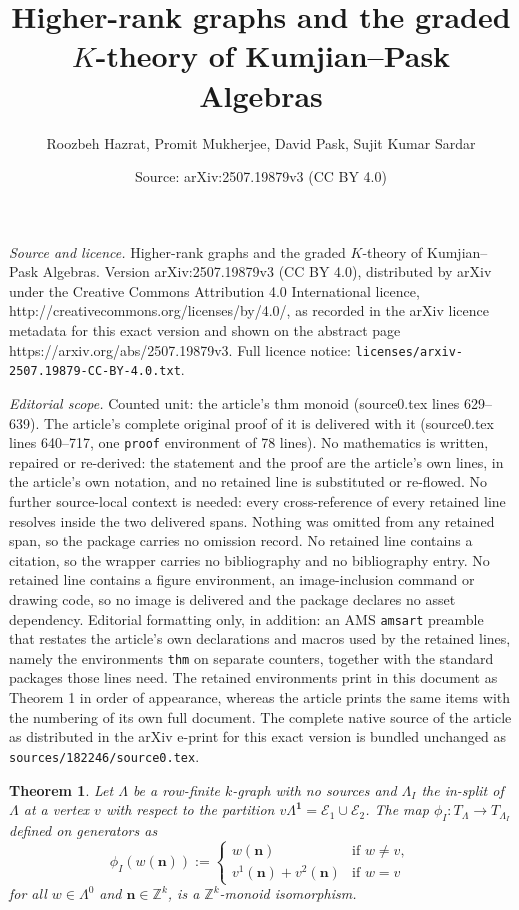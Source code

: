 \documentclass[10pt,a4paper]{amsart}
\title{Higher-rank graphs and the graded $K$-theory of Kumjian--Pask Algebras}
\author{Roozbeh Hazrat, Promit Mukherjee, David Pask, Sujit Kumar Sardar}
\date{Source: arXiv:2507.19879v3 (CC BY 4.0)}
\newtheorem{thm}{Theorem}
\newcommand{\N}{\mathbf{n}}
\begin{document}
\maketitle

\noindent\emph{Source and licence.} Higher-rank graphs and the graded $K$-theory of Kumjian--Pask Algebras. Version arXiv:2507.19879v3 (CC BY 4.0), distributed by arXiv under the Creative Commons Attribution 4.0 International licence, http://creativecommons.org/licenses/by/4.0/, as recorded in the arXiv licence metadata for this exact version and shown on the abstract page https://arxiv.org/abs/2507.19879v3. Full licence notice: \texttt{licenses/arxiv-2507.19879-CC-BY-4.0.txt}.\par\smallskip

\noindent\textit{Editorial scope.} Counted unit: the article's thm monoid (source0.tex lines 629--639). The article's complete original proof of it is delivered with it (source0.tex lines 640--717, one \texttt{proof} environment of 78 lines). No mathematics is written, repaired or re-derived: the statement and the proof are the article's own lines, in the article's own notation, and no retained line is substituted or re-flowed.  No further source-local context is needed: every cross-reference of every retained line resolves inside the two delivered spans.  Nothing was omitted from any retained span, so the package carries no omission record.  No retained line contains a citation, so the wrapper carries no bibliography and no bibliography entry.  No retained line contains a figure environment, an image-inclusion command or drawing code, so no image is delivered and the package declares no asset dependency.  Editorial formatting only, in addition: an AMS \texttt{amsart} preamble that restates the article's own declarations and macros used by the retained lines, namely the environments \texttt{thm} on separate counters, together with the standard packages those lines need.  The retained environments print in this document as Theorem 1 in order of appearance, whereas the article prints the same items with the numbering of its own full document.  The complete native source of the article as distributed in the arXiv e-print for this exact version is bundled unchanged as \texttt{sources/182246/source0.tex}.
\begin{thm}\label{th in-splitting preserves talented monoid}
Let $\Lambda$ be a row-finite $k$-graph with no sources and $\Lambda_I$ the in-split of $\Lambda$ at a vertex $v$ with respect to the partition $v\Lambda^\mathbf{1}=\mathcal{E}_1\cup \mathcal{E}_2$. The map $\phi_I: T_\Lambda \longrightarrow T_{\Lambda_I}$ defined on generators as
$$\phi_I(w(\N)):=
	\left\{
	\begin{array}{ll}
		w(\N)  & \mbox{if } w\neq v, \\
		v^1(\N)+v^2(\N)  & \mbox{if } w=v
	\end{array}
	\right.$$ 
for all $w\in \Lambda^0$ and $\N\in \mathbb{Z}^k$, is a $\mathbb{Z}^k$-monoid isomorphism. 
\end{thm}
\end{document}

